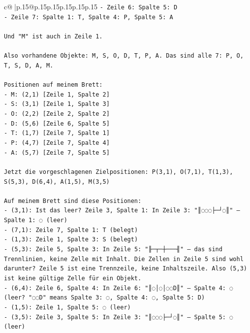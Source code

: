 \documentclass{article}
\begin{document}
{\begin{supertabular}{c@{$\;$}|p{.15\linewidth}@{}p{.15\linewidth}p{.15\linewidth}p{.15\linewidth}p{.15\linewidth}p{.15\linewidth}}
{{{\texttt{{-} Zeile 6: Spalte 5: D} \\
\texttt{{-} Zeile 7: Spalte 1: T, Spalte 4: P, Spalte 5: A} \\
\\ 
\texttt{Und "M" ist auch in Zeile 1.} \\
\\ 
\texttt{Also vorhandene Objekte: M, S, O, D, T, P, A. Das sind alle 7: P, O, T, S, D, A, M.} \\
\\ 
\texttt{Positionen auf meinem Brett:} \\
\texttt{{-} M: (2,1) {[}Zeile 1, Spalte 2{]}} \\
\texttt{{-} S: (3,1) {[}Zeile 1, Spalte 3{]}} \\
\texttt{{-} O: (2,2) {[}Zeile 2, Spalte 2{]}} \\
\texttt{{-} D: (5,6) {[}Zeile 6, Spalte 5{]}} \\
\texttt{{-} T: (1,7) {[}Zeile 7, Spalte 1{]}} \\
\texttt{{-} P: (4,7) {[}Zeile 7, Spalte 4{]}} \\
\texttt{{-} A: (5,7) {[}Zeile 7, Spalte 5{]}} \\
\\ 
\texttt{Jetzt die vorgeschlagenen Zielpositionen: P(3,1), O(7,1), T(1,3), S(5,3), D(6,4), A(1,5), M(3,5)} \\
\\ 
\texttt{Auf meinem Brett sind diese Positionen:} \\
\texttt{{-} (3,1): Ist das leer? Zeile 3, Spalte 1: In Zeile 3: "║◌◌◌├─┘◌║" – Spalte 1: ◌ (leer)} \\
\texttt{{-} (7,1): Zeile 7, Spalte 1: T (belegt)} \\
\texttt{{-} (1,3): Zeile 1, Spalte 3: S (belegt)} \\
\texttt{{-} (5,3): Zeile 5, Spalte 3: In Zeile 5: "╟─┬─┼───╢" – das sind Trennlinien, keine Zelle mit Inhalt. Die Zellen in Zeile 5 sind wohl darunter? Zeile 5 ist eine Trennzeile, keine Inhaltszeile. Also (5,3) ist keine gültige Zelle für ein Objekt.} \\
\texttt{{-} (6,4): Zeile 6, Spalte 4: In Zeile 6: "║◌│◌│◌◌D║" – Spalte 4: ◌ (leer? "◌◌D" means Spalte 3: ◌, Spalte 4: ◌, Spalte 5: D)} \\
\texttt{{-} (1,5): Zeile 1, Spalte 5: ◌ (leer)} \\
\texttt{{-} (3,5): Zeile 3, Spalte 5: In Zeile 3: "║◌◌◌├─┘◌║" – Spalte 5: ◌ (leer)} \\
\\ 
}}}
\end{supertabular}}
\end{document}
